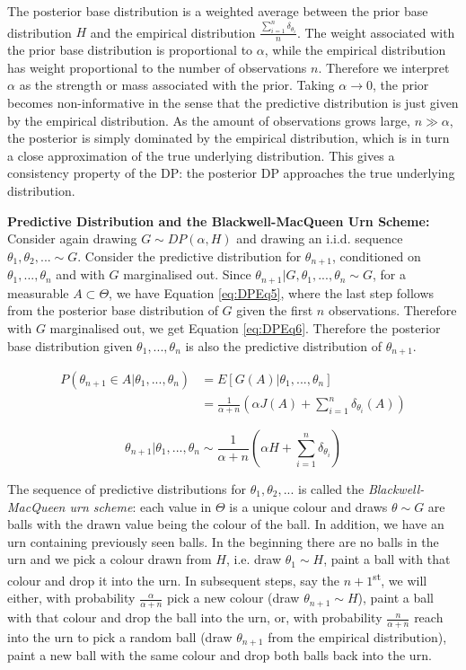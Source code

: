 \noindent The posterior base distribution is a weighted average between the prior base distribution $H$ and the empirical distribution $\frac{\sum_{i=1}^{n}\delta_{\theta_{i}}}{n}$. The weight associated with the prior base distribution is proportional to $\alpha$, while the empirical distribution has weight proportional to the number of observations $n$. Therefore we interpret $\alpha$ as the strength or mass associated with the prior. Taking $\alpha\rightarrow 0$, the prior becomes non-informative in the sense that the predictive distribution is just given by the empirical distribution. As the amount of observations grows large, $n\gg\alpha$, the posterior is simply dominated by the empirical distribution, which is in turn a close approximation of the true underlying distribution. This gives a consistency property of the DP: the posterior DP approaches the true underlying distribution.

\textbf{Predictive Distribution and the Blackwell-MacQueen Urn Scheme:} Consider again drawing $G\sim DP(\alpha,H)$ and drawing an i.i.d. sequence $\theta_{1},\theta_{2},...\sim G$. Consider the predictive distribution for $\theta_{n+1}$, conditioned on $\theta_{1},...,\theta_{n}$ and with $G$ marginalised out. Since $\theta_{n+1}|G,\theta_{1},...,\theta_{n}\sim G$, for a measurable $A\subset\Theta$, we have Equation \ref{eq:DPEq5}, where the last step follows from the posterior base distribution of $G$ given the first $n$ observations. Therefore with $G$ marginalised out, we get Equation \ref{eq:DPEq6}. Therefore the posterior base distribution given $\theta_{1},...,\theta_{n}$ is also the predictive distribution of $\theta_{n+1}$.

\begin{align}
P(\theta_{n+1}\in A|\theta_{1},...,\theta_{n})&=E[G(A)|\theta_{1},...,\theta_{n}] \nonumber
\\
&=\frac{1}{\alpha+n}\left(\alpha J(A)+\sum_{i=1}^{n}\delta_{\theta_{i}}(A)\right)
\label{eq:DPEq5}
\end{align}

\begin{equation}
\label{eq:DPEq6}
\theta_{n+1}|\theta_{1},...,\theta_{n}\sim\frac{1}{\alpha+n}\left(\alpha H+\sum_{i=1}^{n}\delta_{\theta_{i}}\right)
\end{equation}

The sequence of predictive distributions for $\theta_{1},\theta_{2},...$ is called the \textit{Blackwell-MacQueen urn scheme}: each value in $\Theta$ is a unique colour and draws $\theta\sim G$ are balls with the drawn value being the colour of the ball. In addition, we have an urn containing previously seen balls. In the beginning there are no balls in the urn and we pick a colour drawn from $H$, i.e. draw $\theta_{1}\sim H$, paint a ball with that colour and drop it into the urn. In subsequent steps, say the $n+1$\textsuperscript{st}, we will either, with probability $\frac{\alpha}{\alpha+n}$ pick a new colour (draw $\theta_{n+1}\sim H$), paint a ball with that colour and drop the ball into the urn, or, with probability $\frac{n}{\alpha+n}$ reach into the urn to pick a random ball (draw $\theta_{n+1}$ from the empirical distribution), paint a new ball with the same colour and drop both balls back into the urn.

